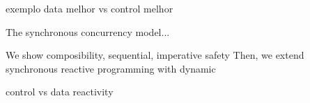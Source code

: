 \documentclass{acm_proc_article-sp}
\newcommand{\1}{\;}
\newcommand{\2}{\;\;}
\newcommand{\3}{\;\;\;}
\newcommand{\5}{\;\;\;\;\;}
\begin{document}
exemplo data melhor vs control melhor

The synchronous concurrency model...

We show composibility, sequential, imperative
safety
Then, we extend synchronous reactive programming with dynamic

control vs data reactivity

\end{document}
